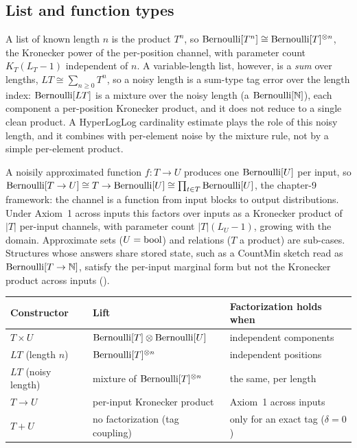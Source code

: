 \subsection*{List and function types}

A list of known length $n$ is the product $T^n$, so $\mathrm{Bernoulli}[T^n] \cong
\mathrm{Bernoulli}[T]^{\otimes n}$, the Kronecker power of the per-position channel, with
parameter count $K_T(L_T - 1)$ independent of $n$. A variable-length list,
however, is a \emph{sum} over lengths, $L T \cong \sum_{n \ge 0} T^n$, so a noisy
length is a sum-type tag error over the length index: $\mathrm{Bernoulli}[L T]$ is a
mixture over the noisy length (a $\mathrm{Bernoulli}[\mathbb{N}]$), each component a
per-position Kronecker product, and it does not reduce to a single clean product.
A HyperLogLog cardinality estimate plays the role of this noisy length, and it
combines with per-element noise by the mixture rule, not by a simple
per-element product.

A noisily approximated function $f : T \to U$ produces one $\mathrm{Bernoulli}[U]$ per
input, so $\mathrm{Bernoulli}[T \to U] \cong T \to \mathrm{Bernoulli}[U] \cong \prod_{t \in T}
\mathrm{Bernoulli}[U]$, the chapter-9 framework: the channel is a function from input
blocks to output distributions. Under Axiom~1 across inputs this factors over
inputs as a Kronecker product of $|T|$ per-input channels, with parameter count
$|T|(L_U - 1)$, growing with the domain. Approximate sets ($U = \mathrm{bool}$) and
relations ($T$ a product) are sub-cases. Structures whose answers share stored
state, such as a CountMin sketch read as $\mathrm{Bernoulli}[T \to \mathbb{N}]$, satisfy
the per-input marginal form but not the Kronecker product across inputs
().

\begin{center}
\small
\begin{tabular}{@{}lll@{}}
\hline
Constructor & Lift & Factorization holds when \\
\hline
$T \times U$ & $\mathrm{Bernoulli}[T] \otimes \mathrm{Bernoulli}[U]$ & independent components \\
$L T$ (length $n$) & $\mathrm{Bernoulli}[T]^{\otimes n}$ & independent positions \\
$L T$ (noisy length) & mixture of $\mathrm{Bernoulli}[T]^{\otimes n}$ & the same, per length \\
$T \to U$ & per-input Kronecker product & Axiom~1 across inputs \\
$T + U$ & no factorization (tag coupling) & only for an exact tag ($\delta = 0$) \\
\hline
\end{tabular}
\end{center}

